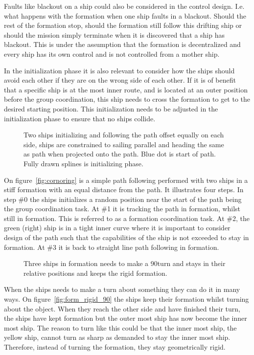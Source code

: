 Faults like blackout on a ship could also be considered in the control
design. I.e. what happens with the formation when one ship faults in a
blackout. Should the rest of the formation stop, should the formation
still follow this drifting ship or should the mission simply terminate
when it is discovered that a ship has blackout. This is under the assumption that the formation is decentralized and every ship has its own control and is not controlled from a mother ship.

In the initialization phase it is also relevant to consider how the
ships should avoid each other if they are on the wrong side of each
other. If it is of benefit that a specific ship is at the most inner route, and is located at an outer position before the group coordination, this ship needs to cross the formation to get to the desired starting position. This initialization needs to be adjusted in the initialization phase to ensure that no ships collide.

\begin{figure}[htbp]
	\centering
	
	\caption{Two ships initializing and following the path offset
		equally on each side, ships are constrained to sailing parallel
		and heading the same as path when projected onto the path. Blue
	dot is start of path. Fully drawn splines is initializing phase.}
	\label{fig:cornoring}
\end{figure}

On figure~\vref{fig:cornoring} is a simple path following performed
with two ships in a stiff formation with an equal distance from the
path. It illustrates four steps. In step \#0 the ships initializes a
random position near the start of the path being the group coordination task. At \#1 it is tracking the
path in formation, whilst still in formation. This is referred to as a formation coordination task. At \#2, the green
(right) ship is in a tight inner curve where it is important to
consider design of the path such that the capabilities of the ship is not
exceeded to stay in formation. At \#3 it is back to straight line path
following in formation.

\begin{figure}[htbp]
	\centering
	
	\caption{Three ships in formation needs to make a 90\textdegree turn and stays in their relative positions and keeps the rigid formation.}
	\label{fig:form_rigid_90}
\end{figure}

When the ships needs to make a turn about something they can do it in many ways. On figure~\vref{fig:form_rigid_90} the ships keep their formation whilst turning about the object. When they reach the other side and have finished their turn, the ships have kept formation but the outer most ship has now become the inner most ship. The reason to turn like this could be that the inner most ship, the yellow ship, cannot turn as sharp as demanded to stay the inner most ship. Therefore, instead of turning the formation, they stay geometrically rigid.


